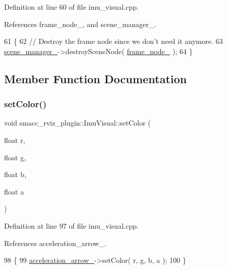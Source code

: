 Definition at line 60 of file imu\+\_\+visual.\+cpp.



References frame\+\_\+node\+\_\+, and scene\+\_\+manager\+\_\+.


\begin{DoxyCode}
61 \{
62   \textcolor{comment}{// Destroy the frame node since we don't need it anymore.}
63   \hyperlink{classsmacc__rviz__plugin_1_1ImuVisual_acef4dba58d14224192bbed7eabbd6cbb}{scene\_manager\_}->destroySceneNode( \hyperlink{classsmacc__rviz__plugin_1_1ImuVisual_ae41316c00ac89e1e0ee0adf62da10841}{frame\_node\_} );
64 \}
\end{DoxyCode}


\subsection{Member Function Documentation}
\mbox{\label{classsmacc__rviz__plugin_1_1ImuVisual_a6b5973fedfb8620c1e1493840ae7c76b}} 
\subsubsection{\texorpdfstring{set\+Color()}{setColor()}}
{\footnotesize\ttfamily void smacc\+\_\+rviz\+\_\+plugin\+::\+Imu\+Visual\+::set\+Color (\begin{DoxyParamCaption}\item[{float}]{r,  }\item[{float}]{g,  }\item[{float}]{b,  }\item[{float}]{a }\end{DoxyParamCaption})}



Definition at line 97 of file imu\+\_\+visual.\+cpp.



References acceleration\+\_\+arrow\+\_\+.


\begin{DoxyCode}
98 \{
99   \hyperlink{classsmacc__rviz__plugin_1_1ImuVisual_abead7d3f3c66b20bba8123a145b121b0}{acceleration\_arrow\_}->setColor( r, g, b, a );
100 \}
\end{DoxyCode}
\mbox{\label{classsmacc__rviz__plugin_1_1ImuVisual_ac308baf22f4bfb15b69b18776d22f181}} 
